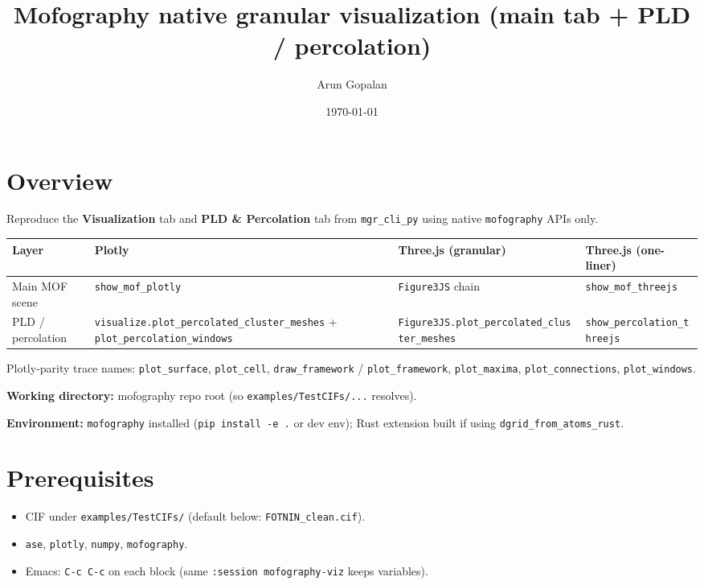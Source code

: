 \documentclass[11pt]{article}
\author{Arun Gopalan}
\date{\today}
\title{Mofography native granular visualization (main tab + PLD / percolation)}
\begin{document}
\maketitle
\tableofcontents

\section{Overview}
\label{sec:orgeb213a1}

Reproduce the \textbf{\textbf{Visualization}} tab and \textbf{\textbf{PLD \& Percolation}} tab from \texttt{mgr\_cli\_py} using native \texttt{mofography} APIs only.

\begin{center}
\begin{tabular}{llll}
Layer & Plotly & Three.js (granular) & Three.js (one-liner)\\
\hline
Main MOF scene & \texttt{show\_mof\_plotly} & \texttt{Figure3JS} chain & \texttt{show\_mof\_threejs}\\
PLD / percolation & \texttt{visualize.plot\_percolated\_cluster\_meshes} + \texttt{plot\_percolation\_windows} & \texttt{Figure3JS.plot\_percolated\_cluster\_meshes} & \texttt{show\_percolation\_threejs}\\
\end{tabular}
\end{center}

Plotly-parity trace names: \texttt{plot\_surface}, \texttt{plot\_cell}, \texttt{draw\_framework} / \texttt{plot\_framework}, \texttt{plot\_maxima}, \texttt{plot\_connections}, \texttt{plot\_windows}.

\textbf{\textbf{Working directory:}} mofography repo root (so \texttt{examples/TestCIFs/...} resolves).

\textbf{\textbf{Environment:}} \texttt{mofography} installed (\texttt{pip install -e .} or dev env); Rust extension built if using \texttt{dgrid\_from\_atoms\_rust}.
\section{Prerequisites}
\label{sec:orgc61c842}

\begin{itemize}
\item CIF under \texttt{examples/TestCIFs/} (default below: \texttt{FOTNIN\_clean.cif}).
\item \texttt{ase}, \texttt{plotly}, \texttt{numpy}, \texttt{mofography}.
\item Emacs: \texttt{C-c C-c} on each block (same \texttt{:session mofography-viz} keeps variables).
\end{itemize}
\end{document}
